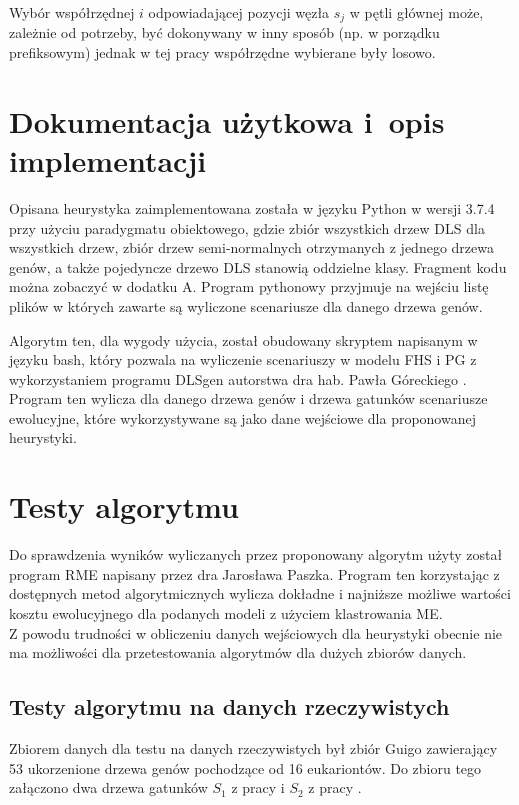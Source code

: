 \documentclass[licencjacka]{pracamgr}
\begin{document}
Wybór współrzędnej $i$ odpowiadającej pozycji węzła $s_j$ w pętli głównej może, zależnie od potrzeby, być dokonywany w inny sposób (np. w porządku prefiksowym) jednak w tej pracy współrzędne wybierane były losowo.

\section{Dokumentacja użytkowa i~opis implementacji}\label{r:impl}
Opisana heurystyka zaimplementowana została w języku Python w wersji 3.7.4 przy użyciu paradygmatu obiektowego, gdzie zbiór wszystkich drzew DLS dla wszystkich drzew, zbiór drzew semi-normalnych otrzymanych z jednego drzewa genów, a także pojedyncze drzewo DLS stanowią oddzielne klasy. Fragment kodu można zobaczyć w dodatku A. Program pythonowy przyjmuje na wejściu listę plików w których zawarte są wyliczone scenariusze dla danego drzewa genów.

Algorytm ten, dla wygody użycia, został obudowany skryptem napisanym w języku bash, który pozwala na wyliczenie scenariuszy w modelu FHS i PG z wykorzystaniem programu DLSgen autorstwa dra hab. Pawła Góreckiego \cite{dlsgen}. Program ten wylicza dla danego drzewa genów i drzewa gatunków scenariusze ewolucyjne, które wykorzystywane są jako dane wejściowe dla proponowanej heurystyki.


\section{Testy algorytmu}
Do sprawdzenia wyników wyliczanych przez proponowany algorytm użyty został program RME napisany przez dra Jarosława Paszka. Program ten korzystając z dostępnych metod algorytmicznych wylicza dokładne i najniższe możliwe wartości kosztu ewolucyjnego dla podanych modeli z użyciem klastrowania ME. \cite{rme}
\\
Z powodu trudności w obliczeniu danych wejściowych dla heurystyki obecnie nie ma możliwości dla przetestowania algorytmów dla dużych zbiorów danych.

\subsection{Testy algorytmu na danych rzeczywistych}
Zbiorem danych dla testu na danych rzeczywistych był zbiór Guigo zawierający 53 ukorzenione drzewa genów pochodzące od 16 eukariontów. Do zbioru tego załączono dwa drzewa gatunków $S_1$ z pracy \cite{guigo} i $S_2$ z pracy \cite{guigo_2}. 
\end{document}

